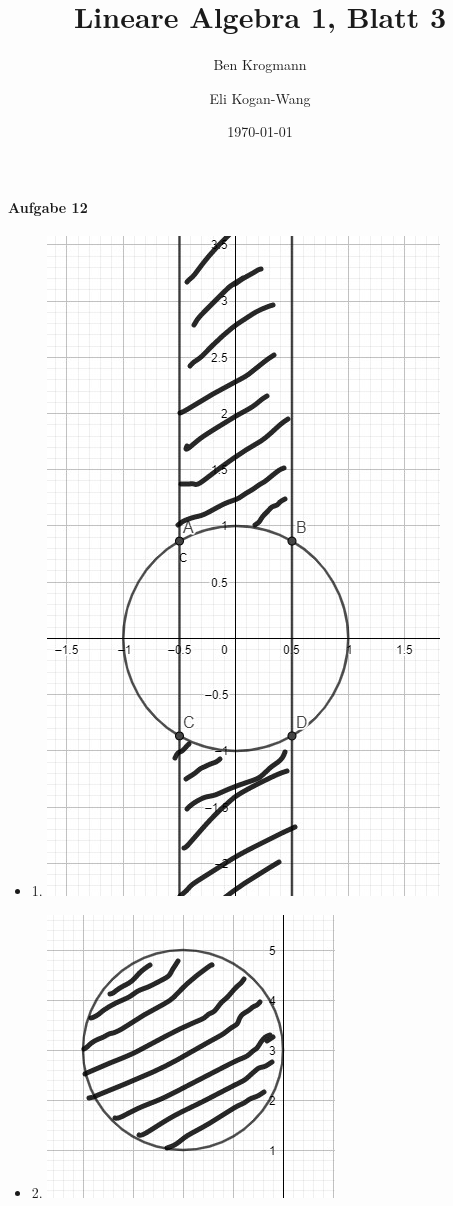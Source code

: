 \documentclass[a4paper,12pt]{article}
\title{Lineare Algebra 1, Blatt 3}
\author{
    Ben Krogmann
    \and
    Eli Kogan-Wang
}
\date{\today}
\begin{document}
\maketitle
\thispagestyle{fancy}

\paragraph{Aufgabe 12}
\begin{itemize}
    \item %
          1. \includegraphics{Lina1Blatt3Aufgabe12}
    \item %
          2. \includegraphics{Lina1Blatt3Aufgabe12b}
\end{itemize}
\end{document}
